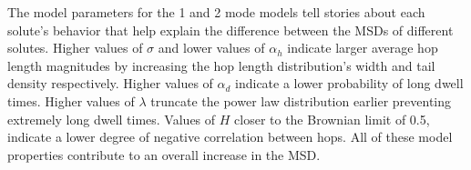 \documentclass{article}
\begin{document}
  
%  
  
  
  The model parameters for the 1 and 2 mode models tell stories about each solute's
  behavior that help explain the difference between the MSDs of different solutes. 
  Higher values of $\sigma$ and lower values of $\alpha_h$ indicate larger average 
  hop length magnitudes by increasing the hop length distribution's width and tail 
  density respectively. Higher values of $\alpha_d$ indicate a lower probability of 
  long dwell times. Higher values of $\lambda$ truncate the power law distribution 
  earlier preventing extremely long dwell times. Values of $H$ closer to the Brownian
  limit of 0.5, indicate a lower degree of negative correlation between hops. All 
  of 
  these model properties
  contribute to 
  an overall increase in the MSD.
\end{document}
